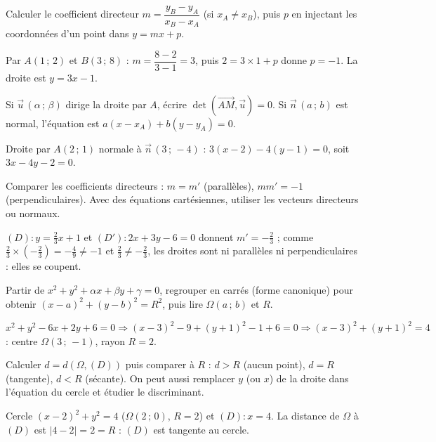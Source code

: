 Calculer le coefficient directeur $m=\dfrac{y_B-y_A}{x_B-x_A}$ (si $x_A\neq x_B$),
puis $p$ en injectant les coordonnées d'un point dans $y=mx+p$.
\begin{exemple}
Par $A(1\,;\,2)$ et $B(3\,;\,8)$ : $m=\dfrac{8-2}{3-1}=3$, puis $2=3\times 1+p$
donne $p=-1$. La droite est $y=3x-1$.
\end{exemple}

Si $\vec{u}\,(\alpha\,;\,\beta)$ dirige la droite par $A$, écrire
$\det(\overrightarrow{AM},\vec{u})=0$. Si $\vec{n}\,(a\,;\,b)$ est normal, l'équation
est $a(x-x_A)+b(y-y_A)=0$.
\begin{exemple}
Droite par $A(2\,;\,1)$ normale à $\vec{n}\,(3\,;\,-4)$ :
$3(x-2)-4(y-1)=0$, soit $3x-4y-2=0$.
\end{exemple}

Comparer les coefficients directeurs : $m=m'$ (parallèles), $mm'=-1$
(perpendiculaires). Avec des équations cartésiennes, utiliser les vecteurs directeurs
ou normaux.
\begin{exemple}
$(D):y=\tfrac{2}{3}x+1$ et $(D'):2x+3y-6=0$ donnent $m'=-\tfrac{2}{3}$ ; comme
$\tfrac{2}{3}\times(-\tfrac{2}{3})=-\tfrac{4}{9}\neq -1$ et $\tfrac{2}{3}\neq-\tfrac{2}{3}$,
les droites sont ni parallèles ni perpendiculaires : elles se coupent.
\end{exemple}

Partir de $x^2+y^2+\alpha x+\beta y+\gamma=0$, regrouper en carrés (forme canonique)
pour obtenir $(x-a)^2+(y-b)^2=R^2$, puis lire $\Omega(a\,;\,b)$ et $R$.
\begin{exemple}
$x^2+y^2-6x+2y+6=0 \Rightarrow (x-3)^2-9+(y+1)^2-1+6=0 \Rightarrow (x-3)^2+(y+1)^2=4$ :
centre $\Omega(3\,;\,-1)$, rayon $R=2$.
\end{exemple}

Calculer $d=d(\Omega,(D))$ puis comparer à $R$ : $d>R$ (aucun point), $d=R$ (tangente),
$d<R$ (sécante). On peut aussi remplacer $y$ (ou $x$) de la droite dans l'équation du
cercle et étudier le discriminant.
\begin{exemple}
Cercle $(x-2)^2+y^2=4$ ($\Omega(2\,;\,0)$, $R=2$) et $(D):x=4$. La distance de
$\Omega$ à $(D)$ est $|4-2|=2=R$ : $(D)$ est tangente au cercle.
\end{exemple}
